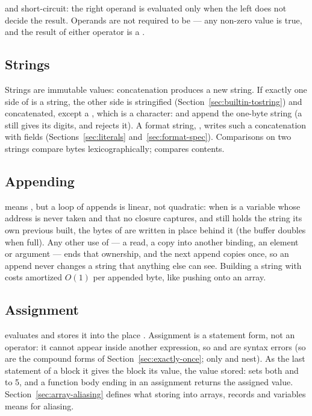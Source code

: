 \ic{\&\&} and \ic{||} short-circuit: the right operand is evaluated
only when the left does not decide the result. Operands are not
required to be  --- any non-zero value is true, and the result
of either operator is a .

\subsection{Strings}

Strings are immutable values: concatenation  produces a new
string. If exactly one side of \ic{+} is a string, the other side is
stringified (Section~\ref{sec:builtin-tostring}) and concatenated, except a
, which is a character:  and  append the
one-byte string  (a  still gives its digits, and \ic{+=}
rejects it).
A format string, , writes such a concatenation
with fields (Sections~\ref{sec:literals} and~\ref{sec:format-spec}).
Comparisons \ic{<} \ic{<=} \ic{>} \ic{>=} on two strings compare bytes
lexicographically; \ic{==} compares contents.

\subsection{Appending}
\label{sec:str-append}
 means , but a loop of
appends is linear, not quadratic: when  is a variable whose
address is never taken and that no closure captures, and  still
holds the string its own previous \ic{+=} built, the bytes of  are
written in place behind it (the buffer doubles when full). Any other
use of  --- a read, a copy into another binding, an element or
argument --- ends that ownership, and the next append copies once, so
an append never changes a string that anything else can see. Building
a string with \ic{+=} costs amortized $O(1)$ per appended byte, like
pushing onto an array.

\subsection{Assignment}
\label{sec:assignment}

 evaluates  and stores it into the place .
Assignment is a statement form, not an operator: it cannot appear inside
another expression, so  and  are
syntax errors (so are the compound forms of
Section~\ref{sec:exactly-once}; only \ic{++} and \ic{--} nest). As the
last statement of a block it gives the block its value, the value
stored:  sets both  and  to 5, and
a function body ending in an assignment returns the assigned value.
Section~\ref{sec:array-aliasing}
defines what storing into arrays, records and variables means for
aliasing.

